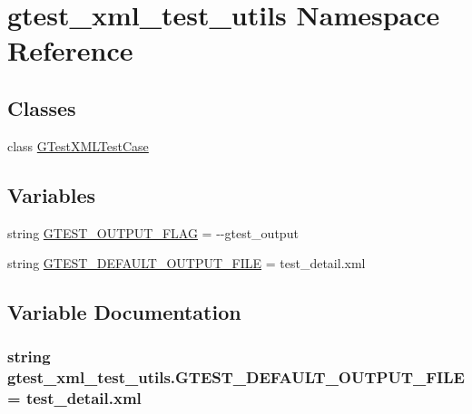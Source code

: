 \hypertarget{namespacegtest__xml__test__utils}{}\section{gtest\+\_\+xml\+\_\+test\+\_\+utils Namespace Reference}
\label{namespacegtest__xml__test__utils}
\subsection*{Classes}
\begin{DoxyCompactItemize}
\item 
class \hyperlink{classgtest__xml__test__utils_1_1_g_test_x_m_l_test_case}{G\+Test\+X\+M\+L\+Test\+Case}
\end{DoxyCompactItemize}
\subsection*{Variables}
\begin{DoxyCompactItemize}
\item 
string \hyperlink{namespacegtest__xml__test__utils_aa354c3ca453d90f496f4cbc576406fb2}{G\+T\+E\+S\+T\+\_\+\+O\+U\+T\+P\+U\+T\+\_\+\+F\+L\+AG} = \textquotesingle{}-\/-\/gtest\+\_\+output\textquotesingle{}
\item 
string \hyperlink{namespacegtest__xml__test__utils_aebe969ed368778716d0619214ff7b853}{G\+T\+E\+S\+T\+\_\+\+D\+E\+F\+A\+U\+L\+T\+\_\+\+O\+U\+T\+P\+U\+T\+\_\+\+F\+I\+LE} = \textquotesingle{}test\+\_\+detail.\+xml\textquotesingle{}
\end{DoxyCompactItemize}


\subsection{Variable Documentation}
\subsubsection[{\texorpdfstring{G\+T\+E\+S\+T\+\_\+\+D\+E\+F\+A\+U\+L\+T\+\_\+\+O\+U\+T\+P\+U\+T\+\_\+\+F\+I\+LE}{GTEST_DEFAULT_OUTPUT_FILE}}]{\setlength{\rightskip}{0pt plus 5cm}string gtest\+\_\+xml\+\_\+test\+\_\+utils.\+G\+T\+E\+S\+T\+\_\+\+D\+E\+F\+A\+U\+L\+T\+\_\+\+O\+U\+T\+P\+U\+T\+\_\+\+F\+I\+LE = \textquotesingle{}test\+\_\+detail.\+xml\textquotesingle{}}\hypertarget{namespacegtest__xml__test__utils_aebe969ed368778716d0619214ff7b853}{}\label{namespacegtest__xml__test__utils_aebe969ed368778716d0619214ff7b853}


